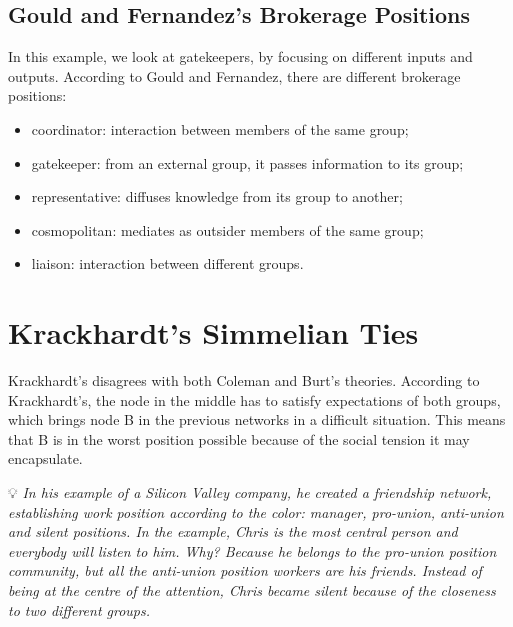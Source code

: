 \documentclass[
  notitlepage,
  onecolumn,
  openany]{book}
\providecommand{\tightlist}{%
  \setlength{\itemsep}{0pt}\setlength{\parskip}{0pt}}
\begin{document}
\hypertarget{gould-and-fernandezs-brokerage-positions}{%
\subsection{Gould and Fernandez's Brokerage Positions}\label{gould-and-fernandezs-brokerage-positions}}

In this example, we look at gatekeepers, by focusing on different inputs
and outputs. According to Gould and Fernandez, there are different
brokerage positions:

\begin{itemize}
\tightlist
\item
  coordinator: interaction between members of the same group;
\item
  gatekeeper: from an external group, it passes information to its
  group;
\item
  representative: diffuses knowledge from its group to another;
\item
  cosmopolitan: mediates as outsider members of the same group;
\item
  liaison: interaction between different groups.
\end{itemize}

\hypertarget{krackhardts-simmelian-ties}{%
\section{Krackhardt's Simmelian Ties}\label{krackhardts-simmelian-ties}}

Krackhardt's disagrees with both Coleman and Burt's theories. According
to Krackhardt's, the node in the middle has to satisfy expectations of
both groups, which brings node B in the previous networks in a difficult
situation. This means that B is in the worst position possible because
of the social tension it may encapsulate.

💡 \emph{In his example of a Silicon Valley company, he created a friendship
network, establishing work position according to the color: manager,
pro-union, anti-union and silent positions. In the example, Chris is the
most central person and everybody will listen to him. Why? Because he
belongs to the pro-union position community, but all the anti-union
position workers are his friends. Instead of being at the centre of the
attention, Chris became silent because of the closeness to two different
groups.}
\end{document}
